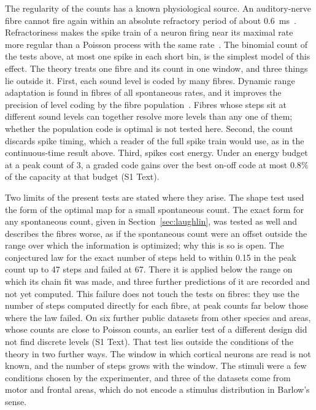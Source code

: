 The regularity of the counts has a known physiological source. An auditory-nerve fibre cannot fire again within an absolute refractory
period of about 0.6~ms~\cite{Heeringa2024}. Refractoriness makes the spike train of a neuron firing near its maximal rate more regular
than a Poisson process with the same rate~\cite{BerryMeister1998}. The binomial count of the tests above, at most one spike in each
short bin, is the simplest model of this effect. The theory treats one fibre and its count in one window, and three things lie outside
it. First, each sound level is coded by many fibres. Dynamic range adaptation is found in fibres of all spontaneous rates, and it
improves the precision of level coding by the fibre population~\cite{Wen2009}. Fibres whose steps sit at different sound levels can
together resolve more levels than any one of them; whether the population code is optimal is not tested here. Second, the count
discards spike timing, which a reader of the full spike train would use, as in the continuous-time result above. Third, spikes cost
energy. Under an energy budget at a peak count of 3, a graded code gains over the best on-off code at most $0.8\%$ of the capacity
at that budget (S1 Text).

Two limits of the present tests are stated where they arise. The shape test used the form of the optimal map for a small spontaneous
count. The exact form for any spontaneous count, given in Section~\ref{sec:laughlin}, was tested as well and describes the fibres
worse, as if the spontaneous count were an offset outside the range over which the information is optimized; why this is so is open. The
conjectured law for the exact number of steps held to within 0.15 in the peak count up to 47 steps and failed at 67. There it is
applied below the range on which its chain fit was made, and three further predictions of it are recorded and not yet computed. This
failure does not touch the tests on fibres: they use the number of steps computed directly for each fibre, at peak counts far below
those where the law failed. On six further public datasets from other species and areas, whose counts are close to Poisson counts, an
earlier test of a different design did not find discrete levels (S1 Text). That test lies outside the conditions of the theory in two
further ways. The window in which cortical neurons are read is not known, and the number of steps grows with the window. The stimuli
were a few conditions chosen by the experimenter, and three of the datasets come from motor and frontal areas, which do not encode
a stimulus distribution in Barlow's sense.
